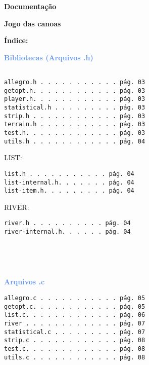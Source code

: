 \documentclass[a4paper,12pt]{article}
\begin{document}
\begin{center} 
  {\Huge \textcolor{NavyBlue}{ \textbf{Documentação}}}
\end{center}

\bigskip
\bigskip
\bigskip



\begin{center} 
  {\Huge \textcolor{NavyBlue}{ \textbf{Jogo das canoas}}}
\end{center}


\newpage %

{\LARGE \textcolor{NavyBlue}{ \textbf{Índice:}}}
\bigskip
\bigskip
\bigskip

{\large \textcolor{CornflowerBlue}{\textbf{Bibliotecas (Arquivos .h)}}}
\begin{verbatim}

allegro.h . . . . . . . . . . . pág. 03
getopt.h. . . . . . . . . . . . pág. 03
player.h. . . . . . . . . . . . pág. 03
statistical.h . . . . . . . . . pág. 03
strip.h . . . . . . . . . . . . pág. 03
terrain.h . . . . . . . . . . . pág. 03
test.h. . . . . . . . . . . . . pág. 03
utils.h . . . . . . . . . . . . pág. 04

\end{verbatim}

{\textcolor{NavyBlue}{ LIST: }}
\begin{verbatim}
list.h . . . . . . . . . . . pág. 04
list-internal.h. . . . . . . pág. 04
list-item.h. . . . . . . . . pág. 04

\end{verbatim}

{\textcolor{NavyBlue}{RIVER:}}
\begin{verbatim}
river.h . . . . . . . . . . pág. 04
river-internal.h. . . . . . pág. 04





\end{verbatim}

{\large \textcolor{CornflowerBlue}{\textbf{Arquivos .c}}}
\begin{verbatim}
allegro.c . . . . . . . . . . . pág. 05
getopt.c. . . . . . . . . . . . pág. 05
list.c. . . . . . . . . . . . . pág. 06
river . . . . . . . . . . . . . pág. 07
statistical.c . . . . . . . . . pág. 07
strip.c . . . . . . . . . . . . pág. 08
test.c. . . . . . . . . . . . . pág. 08
utils.c . . . . . . . . . . . . pág. 08

\end{verbatim}
\end{document}
